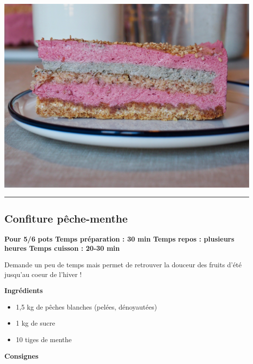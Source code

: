 \documentclass[]{book}
\providecommand{\tightlist}{%
  \setlength{\itemsep}{0pt}\setlength{\parskip}{0pt}}
\begin{document}
\begin{center}\includegraphics[width=0.9\linewidth]{photos/entremet_sesamenoir} \end{center}

\begin{center}\rule{0.5\linewidth}{0.5pt}\end{center}

\subsection*{\texorpdfstring{{Confiture
pêche-menthe}}{Confiture pêche-menthe}}\label{confiture-puxeache-menthe}

\begin{sucrebox}
\textbf{Pour 5/6 pots \textbar{} Temps préparation : 30 min \textbar{}
Temps repos : plusieurs heures\textbar{} Temps cuisson : 20-30 min}

Demande un peu de temps mais permet de retrouver la douceur des fruits
d'été jusqu'au coeur de l'hiver !
\end{sucrebox}

\textbf{Ingrédients}

\begin{itemize}
\tightlist
\item
  1,5 kg de pêches blanches (pelées, dénoyautées)
\item
  1 kg de sucre
\item
  10 tiges de menthe
\end{itemize}

\textbf{Consignes}
\end{document}
